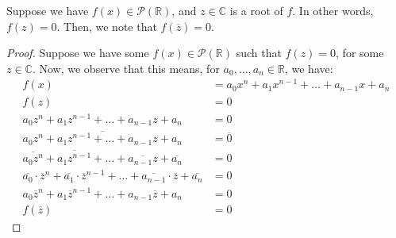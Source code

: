 \documentclass[openany]{book}
\newcommand{\CC}{\mathbb{C}}
\newcommand{\RR}{\mathbb{R}}
\begin{document}
\begin{thm}
	Suppose we have $f(x) \in \mathscr{P}(\RR)$, and $z \in \CC$ is a root of $f$. In other words, $f(z) = 0$. Then, we note that $f(\overline{z}) = 0$.
\end{thm}
\begin{proof}
	Suppose we have some $f(x) \in \mathscr{P}(\RR)$ such that $f(z) = 0$, for some $z \in \CC$. Now, we observe that this means, for $a_{0}, \ldots, a_{n} \in \RR$, we have:
	\begin{align*}
		f(x) &= a_{0}x^{n} + a_{1}x^{n-1} + \ldots + a_{n-1}x + a_{n} \\
		f(z) &= 0 \\ 
		a_{0}z^{n} + a_{1}z^{n-1} + \ldots + a_{n-1}z + a_{n} &= 0 \\
		\overline{a_{0}z^{n} + a_{1}z^{n-1} + \ldots + a_{n-1}z + a_{n}} &= \overline{0} \\
		\overline{a_{0}z^{n}} + \overline{a_{1}z^{n-1}} + \ldots + \overline{a_{n-1}z} + \overline{a_{n}} &= 0 \\
		\overline{a_{0}} \cdot \overline{z}^{n} + \overline{a_{1}}\cdot\overline{z}^{n-1} + \ldots + \overline{a_{n-1}}\cdot\overline{z} + \overline{a_{n}} &= 0 \\
		a_{0}\overline{z}^{n} + a_{1}\overline{z}^{n-1} + \ldots + a_{n-1}\overline{z} + a_{n} &= 0 \\
		f(\overline{z}) &= 0
	\end{align*}
\end{proof}
\end{document}
